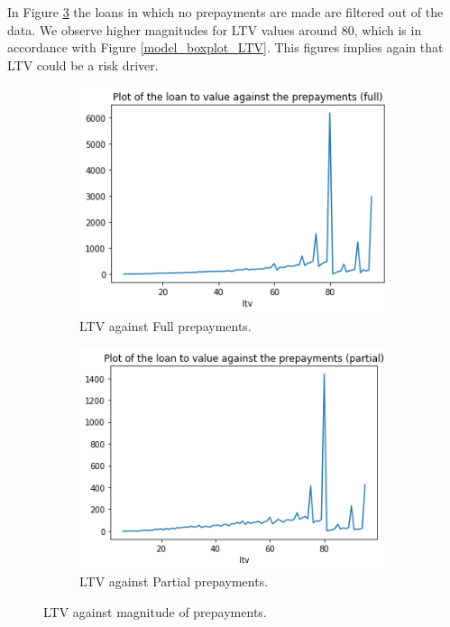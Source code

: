         In Figure \ref{model_LTV_against_prepayment} the loans in which no prepayments are made are filtered out of the data. We observe higher magnitudes for LTV values around 80, which is in accordance with Figure \ref{model_boxplot_LTV}. This figures implies again that LTV could be a risk driver. 
        \begin{figure}[H]
            \centering
            \begin{subfigure}{0.45\textwidth}
                \includegraphics[width=\linewidth]{Latex/Report/Figures/LTV againts Full prepayments.png}
                \caption{LTV against Full prepayments.}
                \label{model_LTV_against_full_prepayment}
            \end{subfigure}
            \begin{subfigure}{0.45\textwidth}
                \includegraphics[width=\linewidth]{Latex/Report/Figures/LTV againts Partial prepayments.png}
                \caption{LTV against Partial prepayments.}
                \label{model_LTV_against_partial_prepayment}
            \end{subfigure}
            \caption{LTV against magnitude of prepayments.}
            \label{model_LTV_against_prepayment}
        \end{figure}
    
